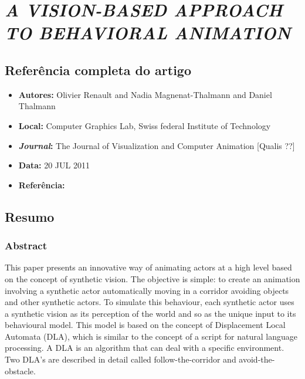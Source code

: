 \section{\textit{A VISION-BASED APPROACH TO
BEHAVIORAL ANIMATION}}


\subsection{Referência completa do artigo}

\begin{itemize}
  \item \textbf{Autores:} Olivier Renault and Nadia Magnenat-Thalmann and Daniel Thalmann
  \item \textbf{Local:} Computer Graphics Lab, Swiss federal Institute of Technology
  \item \textbf{\textit{Journal}:} The Journal of Visualization and Computer Animation [Qualis ??]
  \item \textbf{Data:} 20 JUL 2011
  \item \textbf{Referência:} 
\end{itemize}


\subsection{Resumo}
\subsubsection{Abstract}
This paper presents an innovative way of animating actors at a high level based on the concept of synthetic vision. The objective is simple: to create an animation involving a synthetic actor automatically moving in a corridor avoiding objects and other synthetic actors. To simulate this behaviour, each synthetic actor uses a synthetic vision as its perception of the world and so as the unique input to its behavioural model. This model is based on the concept of Displacement Local Automata (DLA), which is similar to the concept of a script for natural language processing. A DLA is an algorithm that can deal with a specific environment. Two DLA's are described in detail called follow-the-corridor and avoid-the-obstacle.

